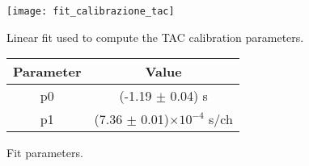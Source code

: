 \begin{figure}[h!]
\begin{minipage}[b]{0.6\textwidth}
\centering
\texttt{[image: fit\_calibrazione\_tac]}
\caption{Linear fit used to compute the TAC calibration parameters.}
\label{fig: fit tac}
\end{minipage}
\hfill
\begin{minipage}[b]{0.45\textwidth}
\centering
\begin{tabular}{cc}
\toprule
\toprule
Parameter & Value \\
\midrule
p0     & (-1.19 $\pm$  0.04) s \\
p1     & (7.36   $\pm$  0.01)$\times 10^{-4}$ s/ch\\
\bottomrule
\bottomrule
\end{tabular}
\vspace{1.5cm}
\caption*{Fit parameters.}
\end{minipage}
\end{figure}
\newpage


